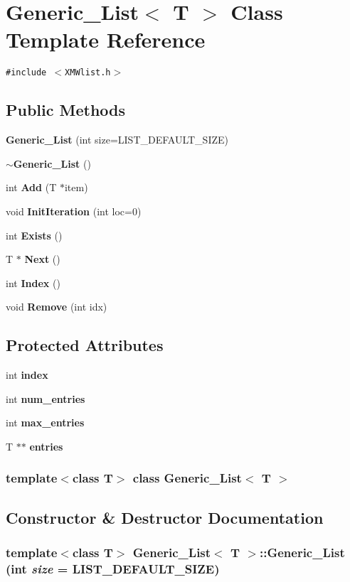 \section{Generic\_\-List$<$ T $>$  Class Template Reference}
\label{classGeneric__List}
{\tt \#include $<$XMWlist.h$>$}

\subsection*{Public Methods}
\begin{CompactItemize}
\item 
{\bf Generic\_\-List} (int size=LIST\_\-DEFAULT\_\-SIZE)
\item 
{\bf $\sim$Generic\_\-List} ()
\item 
int {\bf Add} (T $\ast$item)
\item 
void {\bf Init\-Iteration} (int loc=0)
\item 
int {\bf Exists} ()
\item 
T $\ast$ {\bf Next} ()
\item 
int {\bf Index} ()
\item 
void {\bf Remove} (int idx)
\end{CompactItemize}
\subsection*{Protected Attributes}
\begin{CompactItemize}
\item 
int {\bf index}
\item 
int {\bf num\_\-entries}
\item 
int {\bf max\_\-entries}
\item 
T $\ast$$\ast$ {\bf entries}
\end{CompactItemize}
\subsubsection*{template$<$class T$>$ class Generic\_\-List$<$ T $>$}



\subsection{Constructor \& Destructor Documentation}
\subsubsection{\setlength{\rightskip}{0pt plus 5cm}template$<$class T$>$ Generic\_\-List$<$ T $>$::Generic\_\-List (int {\em size} = LIST\_\-DEFAULT\_\-SIZE)\hspace{0.3cm}{\tt  [inline]}}\label{classGeneric__List_a0}




